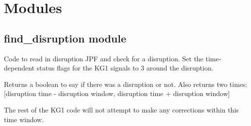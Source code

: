 \documentclass[letterpaper,10pt,english]{sphinxmanual}
\begin{document}

\begin{fulllineitems}
\label{Cormat_main:Cormat_main.hex_}
\end{fulllineitems}


\begin{fulllineitems}
\label{Cormat_main:Cormat_main.oct_}
\end{fulllineitems}



\chapter{Modules}
\label{modules:modules}\label{modules::doc}

\section{find\_disruption module}
\label{find_disruption:module-find_disruption}\label{find_disruption:find-disruption-module}\label{find_disruption::doc}
Code to read in disruption JPF and check
for a disruption. Set the time-dependent status flags for the KG1
signals to 3 around the disruption.

Returns a boolean to say if there was a disruption or not.
Also returns two times: {[}disruption time - disruption window, disruption time + disruption window{]}

The rest of the KG1 code will not attempt to make any corrections within this time window.
\end{document}
